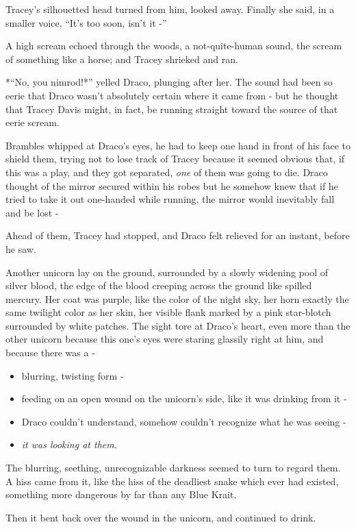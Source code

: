 Tracey's silhouetted head turned from him, looked away. Finally she
said, in a smaller voice, ``It's too soon, isn't it -''

A high scream echoed through the woods, a not-quite-human sound, the
scream of something like a horse; and Tracey shrieked and ran.

*``No, you nimrod!*'' yelled Draco, plunging after her. The sound had
been so eerie that Draco wasn't absolutely certain where it came from -
but he thought that Tracey Davis might, in fact, be running straight
toward the source of that eerie scream.

Brambles whipped at Draco's eyes, he had to keep one hand in front of
his face to shield them, trying not to lose track of Tracey because it
seemed obvious that, if this was a play, and they got separated,
\emph{one} of them was going to die. Draco thought of the mirror secured
within his robes but he somehow knew that if he tried to take it out
one-handed while running, the mirror would inevitably fall and be lost -

Ahead of them, Tracey had stopped, and Draco felt relieved for an
instant, before he saw.

Another unicorn lay on the ground, surrounded by a slowly widening pool
of silver blood, the edge of the blood creeping across the ground like
spilled mercury. Her coat was purple, like the color of the night sky,
her horn exactly the same twilight color as her skin, her visible flank
marked by a pink star-blotch surrounded by white patches. The sight tore
at Draco's heart, even more than the other unicorn because this one's
eyes were staring glassily right at him, and because there was a -

\begin{itemize}
\item
  blurring, twisting form -
\item
  feeding on an open wound on the unicorn's side, like it was drinking
  from it -
\item
  Draco couldn't understand, somehow couldn't recognize what he was
  seeing -
\item
  \emph{it was looking at them.}
\end{itemize}

The blurring, seething, unrecognizable darkness seemed to turn to regard
them. A hiss came from it, like the hiss of the deadliest snake which
ever had existed, something more dangerous by far than any Blue Krait.

Then it bent back over the wound in the unicorn, and continued to drink.

